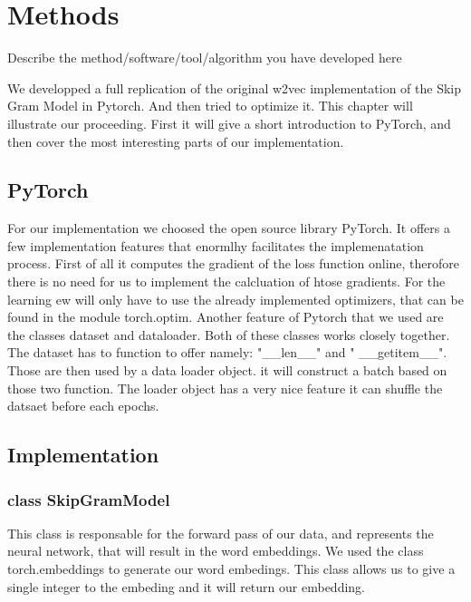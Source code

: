 \chapter{Methods}\label{chap:methods}
Describe the method/software/tool/algorithm you have developed here

We developped a  full replication of the original w2vec implementation of the Skip Gram Model in Pytorch. And then tried to optimize it. This chapter will illustrate our proceeding. First it will give a short introduction to PyTorch, and then cover the most interesting parts of our implementation. 
\section{PyTorch}
For our implementation we choosed the open source library PyTorch. It offers a few  implementation features that enormlhy facilitates the implemenatation process. First of all it computes the gradient of the loss function online, therofore there is no need for us to implement the calcluation of htose gradients. For the learning ew will only have to use the already implemented optimizers, that can be found in the module torch.optim. Another feature of Pytorch that we used are the classes dataset and dataloader. Both of these classes works closely together.   The dataset has to function to offer namely: "\_\_len\_\_" and " \_\_getitem\_\_". Those are then used by a data loader object. it will construct a batch based on those two function. The loader object has a very nice feature it can shuffle the datsaet before each epochs. 
\section{Implementation}
\subsection{class SkipGramModel}
This class is responsable for the forward pass of our data, and represents the neural network, that will result in the word embeddings. We used the class torch.embeddings to generate our word embedings. This class allows us to give a single integer to the embeding and it will return our embedding.  
